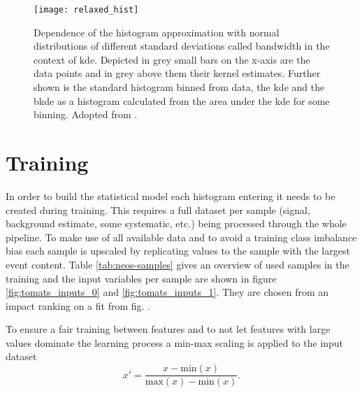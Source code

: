 \begin{figure}
    \centering
    \texttt{[image: relaxed\_hist]}
    \caption[]{Dependence of the histogram approximation with normal distributions of different standard deviations called bandwidth in the context of \ac{kde}. Depicted in grey small bars on the x-axis are the data points and in grey above them their kernel estimates. Further shown is the standard histogram binned from data, the \ac{kde} and the \ac{bkde} as a histogram calculated from the area under the \ac{kde} for some binning. Adopted from \citep{Simpson_2023}.}
    \label{fig:relaxed_hist}
\end{figure}


\section{Training}
In order to build the statistical model each histogram entering it needs to be created during training. This requires a full dataset per sample (signal, background estimate, some systematic, etc.) being processed through the whole pipeline. To make use of all available data and to avoid a training class imbalance bias each sample is upscaled by replicating values to the sample with the largest event content. Table \ref{tab:neos-samples} gives an overview of used samples in the training and the input variables per sample are shown in figure \ref{fig:tomats_inputs_0} and \ref{fig:tomats_inputs_1}. They are chosen from an impact ranking on a \mhh fit from fig. .


To ensure a fair training between features and to not let features with large values dominate the learning process a min-max scaling is applied to the input dataset
\begin{equation}
    x'=\frac{x - \text{min}(x)}{\text{max}(x)-\text{min}(x)}.
\end{equation}

